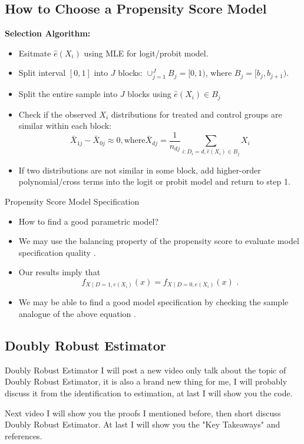 \documentclass[11pt,aspectratio=169]{beamer}
\begin{document}
\subsection{How to Choose a Propensity Score Model}
\begin{frame}
\textbf{Selection Algorithm:}
\begin{itemize}
    \item Esitmate $\hat{e}(X_i)$ using MLE for logit/probit model.
    \item Split interval $[0,1]$ into $J$ blocks: $\cup^J_{j=1}B_j=[0,1)$, where $B_j=[b_j,b_{j+1}).$
    \item Split the entire sample into $J$ blocks using $\hat{e}(X_i)\in B_j$
    \item Check if the observed $X_i$ distributions for treated and control groups are similar within each block:$$\bar{X}_{1j}-\bar{X}_{0j} \approx0, \text{where} \bar{X}_{dj}=\frac{1}{n_{dj}}\sum_{i:D_i=d, \hat{e}(X_i)\in B_j} X_i$$
    \item If two distributions are not similar in some block, add higher-order polynomial/cross terms into the logit or probit model and return to step 1.
\end{itemize}

\end{frame}




\begin{frame}{Propensity Score Model Specification}

\begin{itemize}
    \item How to find a good parametric model? 
    \item We may use the balancing property of the propensity score to evaluate model specification quality .
    \item Our results imply that
    $$f_{X \mid D=1, e(X_i)}(x) = f_{X \mid D=0, e(X_i)}(x) \text{ .}$$
    \item We may be able to find a good model specification by checking the sample analogue of the above equation .
\end{itemize}

\end{frame}

\subsection{Doubly Robust Estimator}
\begin{frame}{Doubly Robust Estimator}
I will post a new video only talk about the topic of Doubly Robust Estimator, it is also a brand new thing for me, I will probably discuss it from the identification to estimation, at last I will show you the code.

\end{frame}
\begin{frame}
    Next video I will show you the proofs I mentioned before, then short discuss Doubly Robust Estimator. At last I will show you the "Key Takeaways" and references.
\end{frame}
\end{document}
